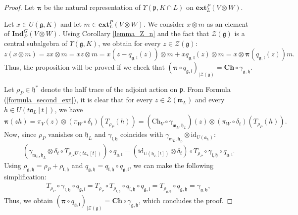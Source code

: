 \documentclass{amsart}
\theoremstyle{definition}
\begin{document}
\begin{proof}
    Let $\bm{\pi}$ be the natural representation of $\Upsilon(\bm{\mathfrak{p}},K\cap L)$ on $\mathbf{ext}_L^P(V \otimes W)$.
    
    Let $x \in U(\bm{\mathfrak{g}},K)$ and let $m \in \mathbf{ext}_L^P(V \otimes W)$. We consider $x \otimes m$ as an element of $\mathbf{Ind}_P^G(V\otimes W)$. Using Corollary \ref{lemma_Z_n} and the fact that $\mathcal{Z}(\bm{\mathfrak{g}})$ is a central subalgebra of $\Upsilon(\bm{\mathfrak{g}},K)$, we obtain for every $z \in \mathcal{Z}(\bm{\mathfrak{g}})$:
    \[z(x \otimes m) = zx \otimes m = xz \otimes m = x(z - q_{\mathfrak{g},\mathfrak{l}}(z)) \otimes m + xq_{\mathfrak{g},\mathfrak{l}}(z) \otimes m = x \otimes \bm{\pi}(q_{\mathfrak{g},\mathfrak{l}}(z))m. \]
    Thus, the proposition will be proved if we check that $(\bm{\pi} \circ q_{\mathfrak{g},\mathfrak{l}})_{|\mathcal{Z}(\bm{\mathfrak{g}})} = \mathbf{Ch} \circ \gamma_{\mathfrak{g}, \mathfrak{h}}$.
    
    Let $\rho_P\in \mathfrak{h}^*$ denote the half trace of the adjoint action on $\mathfrak{p}$. From Formula (\ref{formula_second_ext}), it is clear that for every $z \in \mathcal{Z}(\bm{\mathfrak{m}}_L)$ and every $h \in U(t\mathfrak{a}_L[t])$, we have
    \[\bm{\pi}(zh) = \pi_V(z) \otimes (\pi_W \circ\delta_t)(T_{\rho_P}(h)) = (\mathrm{Ch}_V \circ \gamma_{\mathfrak{m}_L,\mathfrak{h}_L})(z) \otimes (\pi_W \circ\delta_t)(T_{\rho_P}(h)).\]
    Now, since $\rho_P$ vanishes on $\mathfrak{h}_L$ and \(\gamma_{\mathfrak{l},\mathfrak{h}}\) coincides with $\gamma_{\mathfrak{m}_L,\mathfrak{h}_L} \otimes \mathrm{id}_{U(\mathfrak{a}_L)}$:
    \begin{gather*}
        \left(\gamma_{\mathfrak{m}_L,\mathfrak{h}_L} \otimes \delta_t \circ T_{\rho_P|U(t\mathfrak{a}_L[t])}\right) \circ q_{\mathfrak{g},\mathfrak{l}} =(\mathrm{id}_{U(\mathfrak{h}_L[t])}\otimes \delta_t)\circ T_{\rho_P} \circ \gamma_{\mathfrak{l},\mathfrak{h}}\circ q_{\mathfrak{g},\mathfrak{l}}.
    \end{gather*}
    Using $\rho_{\mathfrak{g},\mathfrak{h}} = \rho_P + \rho_{\mathfrak{l},\mathfrak{h}}$ and $q_{\mathfrak{g},\mathfrak{h}} = q_{\mathfrak{l},\mathfrak{h}} \circ q_{\mathfrak{g},\mathfrak{l}}$, we can make the following simplification:
    \begin{gather*}
        T_{\rho_P} \circ \gamma_{\mathfrak{l},\mathfrak{h}}\circ q_{\mathfrak{g},\mathfrak{l}} = T_{\rho_P} \circ T_{\rho_{\mathfrak{l},\mathfrak{h}}} \circ q_{\mathfrak{l},\mathfrak{h}} \circ q_{\mathfrak{g},\mathfrak{l}} = T_{\rho_{\mathfrak{g},\mathfrak{h}}} \circ q_{\mathfrak{g},\mathfrak{h}} = \gamma_{\mathfrak{g},\mathfrak{h}},
    \end{gather*}
    Thus, we obtain $(\bm{\pi} \circ q_{\mathfrak{g},\mathfrak{l}})_{|\mathcal{Z}(\bm{\mathfrak{g}})} = \mathbf{Ch} \circ \gamma_{\mathfrak{g}, \mathfrak{h}}$,
    which concludes the proof.
\end{proof}
\end{document}
